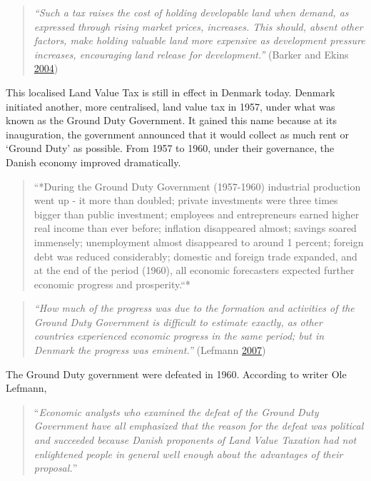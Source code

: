 \documentclass[]{tufte-handout}
\begin{document}
\begin{quote}
\emph{``Such a tax raises the cost of holding developable land when
demand, as expressed through rising market prices, increases. This
should, absent other factors, make holding valuable land more expensive
as development pressure increases, encouraging land release for
development.''} (Barker and Ekins
\protect\hyperlink{ref-Barker2004}{2004})
\end{quote}

This localised Land Value Tax is still in effect in Denmark today.
Denmark initiated another, more centralised, land value tax in 1957,
under what was known as the Ground Duty Government. It gained this name
because at its inauguration, the government announced that it would
collect as much rent or `Ground Duty' as possible. From 1957 to 1960,
under their governance, the Danish economy improved dramatically.

\begin{quote}
``*During the Ground Duty Government (1957-1960) industrial production
went up - it more than doubled; private investments were three times
bigger than public investment; employees and entrepreneurs earned higher
real income than ever before; inflation disappeared almost; savings
soared immensely; unemployment almost disappeared to around 1 percent;
foreign debt was reduced considerably; domestic and foreign trade
expanded, and at the end of the period (1960), all economic forecasters
expected further economic progress and prosperity.``*
\end{quote}

\begin{quote}
\emph{``How much of the progress was due to the formation and activities
of the Ground Duty Government is difficult to estimate exactly, as other
countries experienced economic progress in the same period; but in
Denmark the progress was eminent.''} (Lefmann
\protect\hyperlink{ref-Lefmann2007}{2007})
\end{quote}

The Ground Duty government were defeated in 1960. According to writer
Ole Lefmann,

\begin{quote}
``\emph{Economic analysts who examined the defeat of the Ground Duty
Government have all emphasized that the reason for the defeat was
political and succeeded because Danish proponents of Land Value Taxation
had not enlightened people in general well enough about the advantages
of their proposal.}''
\end{quote}
\end{document}
